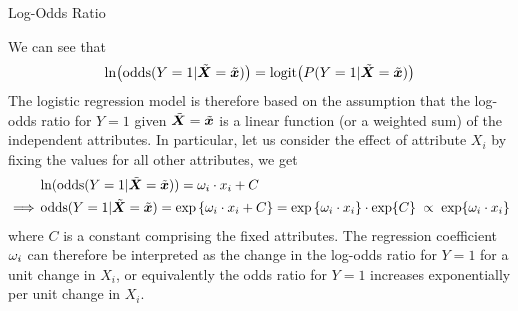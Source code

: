 \begin{frame}{Log-Odds Ratio}

We can see that 
\begin{align*}
    \ln\bigl(\operatorname{odds}(Y=1|\tilde{{\boldsymbol X}}=\tilde{{\boldsymbol x}})\bigr) =
    \text{logit}\bigl(P(Y=1|\tilde{{\boldsymbol X}}=\tilde{{\boldsymbol x}})\bigr)
\end{align*}
%
The logistic regression model is therefore based on the assumption that
the log-odds ratio for $Y=1$ given  $\tilde{{\boldsymbol X}}=\tilde{{\boldsymbol x}}$ is a linear function (or a
weighted sum) of the independent attributes. 
In particular, let us consider the effect of attribute $X_i$ by fixing
the values for all other attributes,%
we get
\begin{align*}
    & \ln(\operatorname{odds}(Y=1|\tilde{{\boldsymbol X}}=\tilde{{\boldsymbol x}})) = \omega_i \cdot x_i + C\\
    \implies & \operatorname{odds}(Y=1|\tilde{{\boldsymbol X}}=\tilde{{\boldsymbol x}}) = \exp\left\{\omega_i \cdot x_i + C\right\} =
    \exp\left\{\omega_i \cdot x_i\right\} \cdot
    \exp\{C\} \; \propto \; \exp\{\omega_i \cdot x_i\}
\end{align*}
where $C$ is a constant comprising the fixed attributes.
The regression coefficient $\omega_i$ can therefore be interpreted as the change
in the log-odds ratio for $Y=1$ for a unit change in $X_i$, or equivalently the
odds ratio for $Y=1$ increases exponentially per unit change in
$X_i$.
\end{frame}
%
%

